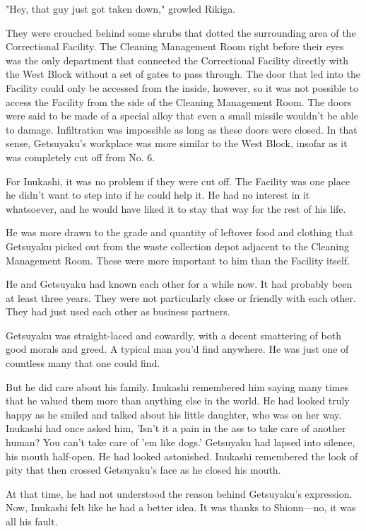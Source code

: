 "Hey, that guy just got taken down," growled Rikiga.

They were crouched behind some shrubs that dotted the surrounding area
of the Correctional Facility. The Cleaning Management Room right before
their eyes was the only department that connected the Correctional
Facility directly with the West Block without a set of gates to pass
through. The door that led into the Facility could only be accessed from
the inside, however, so it was not possible to access the Facility from
the side of the Cleaning Management Room. The doors were said to be made
of a special alloy that even a small missile wouldn't be able to damage.
Infiltration was impossible as long as these doors were closed. In that
sense, Getsuyaku's workplace was more similar to the West Block, insofar
as it was completely cut off from No. 6.

For Inukashi, it was no problem if they were cut off. The Facility was
one place he didn't want to step into if he could help it. He had no
interest in it whatsoever, and he would have liked it to stay that way
for the rest of his life.

He was more drawn to the grade and quantity of leftover food and
clothing that Getsuyaku picked out from the waste collection depot
adjacent to the Cleaning Management Room. These were more important to
him than the Facility itself.

He and Getsuyaku had known each other for a while now. It had probably
been at least three years. They were not particularly close or friendly
with each other. They had just used each other as business partners.

Getsuyaku was straight-laced and cowardly, with a decent smattering of
both good morals and greed. A typical man you'd find anywhere. He was
just one of countless many that one could find.

But he did care about his family. Inukashi remembered him saying many
times that he valued them more than anything else in the world. He had
looked truly happy as he smiled and talked about his little daughter,
who was on her way. Inukashi had once asked him, 'Isn't it a pain in the
ass to take care of another human? You can't take care of 'em like
dogs.' Getsuyaku had lapsed into silence, his mouth half-open. He had
looked astonished. Inukashi remembered the look of pity that then
crossed Getsuyaku's face as he closed his mouth.

At that time, he had not understood the reason behind Getsuyaku's
expression. Now, Inukashi felt like he had a better idea. It was thanks
to Shionn---no, it was all his fault.

